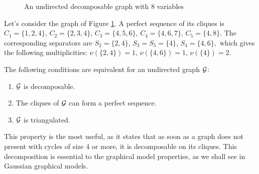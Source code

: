 \begin{figure}[H]
 \begin{center}
 \caption{An undirected decomposable graph with 8 variables}
  \label{ex:graph}
    \end{center}
\end{figure}
 Let's consider the graph of Figure \ref{ex:graph}. A perfect sequence of its cliques is 
$C_1=\{1,2,4\}$, $C_2=\{2,3,4\}$, $C_3=\{4,5,6\}$, $C_4=\{4,6,7\}$, $C_5=\{4,8\}$. The corresponding separators are $S_2=\{2,4\}$, $S_3=S_5=\{4\}$, $S_4=\{4,6\},$ which gives the following multiplicities: $\nu(\{2,4\})=1$,  $\nu(\{4,6\})=1$, $\nu(\{4\})=2$.  


\begin{prop}
\label{decomp}
The following conditions are equivalent for an undirected graph $\mathcal{G}$:
\begin{enumerate}[label=(\roman*)]
\item $\mathcal{G}$ is decomposable.
\item The cliques of $\mathcal{G}$ can form a perfect sequence.
\item $\mathcal{G}$ is triangulated.
\end{enumerate}
\end{prop}

 This property is the most useful, as it states that as soon as a graph does not present with cycles of size 4 or more, it is decomposable on its cliques. This decomposition is essential to the graphical model properties, as we shall see in Gaussian graphical models.
 
